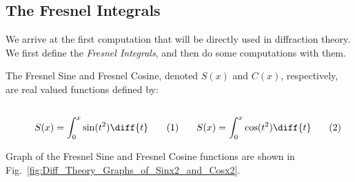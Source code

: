 \documentclass[crop=false,class=book,oneside]{standalone}
\begin{document}
        \subsection{The Fresnel Integrals}
            We arrive at the first computation that will be
            directly used in diffraction theory. We first define
            the \textit{Fresnel Integrals}, and then do some
            computations with them.
            \begin{definition}
                The Fresnel Sine and Fresnel Cosine, denoted
                $S(x)$ and $C(x)$, respectively, are real valued
                functions defined by:
                \par\hfill\par
                \vspace{-1ex}
                \begin{subequations}
                    \begin{minipage}{0.49\textwidth}
                        \begin{equation}
                            S(x)=\int_{0}^{x}
                            \sin(t^{2})\diff{t}
                        \end{equation}
                    \end{minipage}
                    \hfill
                    \begin{minipage}{0.49\textwidth}
                        \begin{equation}
                            S(x)=\int_{0}^{x}
                            \cos(t^{2})\diff{t}
                        \end{equation}
                    \end{minipage}
                \end{subequations}
            \end{definition}
            Graph of the Fresnel Sine and Fresnel Cosine functions are
            shown in Fig.~\ref{fig:Diff_Theory_Graphs_of_Sinx2_and_Cosx2}.
\end{document}
